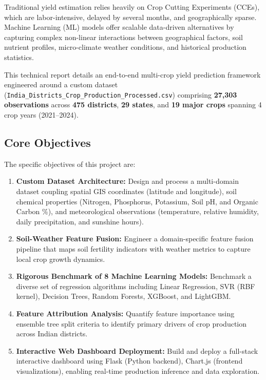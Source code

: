 \documentclass[11pt,a4paper]{article}
\begin{document}
Traditional yield estimation relies heavily on Crop Cutting Experiments (CCEs), which are labor-intensive, delayed by several months, and geographically sparse. Machine Learning (ML) models offer scalable data-driven alternatives by capturing complex non-linear interactions between geographical factors, soil nutrient profiles, micro-climate weather conditions, and historical production statistics.

This technical report details an end-to-end multi-crop yield prediction framework engineered around a custom dataset (\texttt{India\_Districts\_Crop\_Production\_Processed.csv}) comprising \textbf{27,303 observations} across \textbf{475 districts}, \textbf{29 states}, and \textbf{19 major crops} spanning 4 crop years (2021--2024).

\subsection{Core Objectives}
The specific objectives of this project are:
\begin{enumerate}
    \item \textbf{Custom Dataset Architecture:} Design and process a multi-domain dataset coupling spatial GIS coordinates (latitude and longitude), soil chemical properties (Nitrogen, Phosphorus, Potassium, Soil pH, and Organic Carbon \%), and meteorological observations (temperature, relative humidity, daily precipitation, and sunshine hours).
    \item \textbf{Soil-Weather Feature Fusion:} Engineer a domain-specific feature fusion pipeline that maps soil fertility indicators with weather metrics to capture local crop growth dynamics.
    \item \textbf{Rigorous Benchmark of 8 Machine Learning Models:} Benchmark a diverse set of regression algorithms including Linear Regression, SVR (RBF kernel), Decision Trees, Random Forests, XGBoost, and LightGBM.
    \item \textbf{Feature Attribution Analysis:} Quantify feature importance using ensemble tree split criteria to identify primary drivers of crop production across Indian districts.
    \item \textbf{Interactive Web Dashboard Deployment:} Build and deploy a full-stack interactive dashboard using Flask (Python backend), Chart.js (frontend visualizations), enabling real-time production inference and data exploration.
\end{enumerate}

\end{document}
